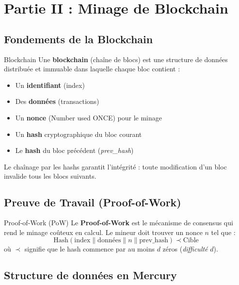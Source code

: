 \documentclass[12pt,a4paper]{article}
\begin{document}
\section{Partie II : Minage de Blockchain}

\subsection{Fondements de la Blockchain}

\begin{definitionbox}{Blockchain}
Une \textbf{blockchain} (chaîne de blocs) est une structure de données
distribuée et immuable dans laquelle chaque bloc contient :
\begin{itemize}
  \item Un \textbf{identifiant} (index)
  \item Des \textbf{données} (transactions)
  \item Un \textbf{nonce} (Number used ONCE) pour le minage
  \item Un \textbf{hash} cryptographique du bloc courant
  \item Le \textbf{hash} du bloc précédent (\emph{prev\_hash})
\end{itemize}
Le chaînage par les hashs garantit l'intégrité : toute modification d'un
bloc invalide tous les blocs suivants.
\end{definitionbox}

\subsection{Preuve de Travail (Proof-of-Work)}

\begin{definitionbox}{Proof-of-Work (PoW)}
Le \textbf{Proof-of-Work} est le mécanisme de consensus qui rend le minage
coûteux en calcul. Le mineur doit trouver un nonce $n$ tel que :
$$\text{Hash}(\text{index} \| \text{données} \| n \| \text{prev\_hash})
  \prec \text{Cible}$$
où $\prec$ signifie que le hash commence par au moins $d$ zéros
(\emph{difficulté} $d$).
\end{definitionbox}

\subsection{Structure de données en Mercury}
\end{document}
